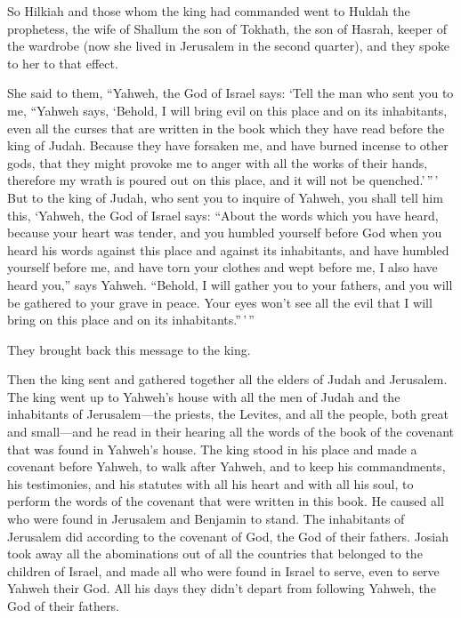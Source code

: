  So Hilkiah and those whom the king had commanded went to
Huldah the prophetess, the wife of Shallum the son of Tokhath, the son
of Hasrah, keeper of the wardrobe (now she lived in Jerusalem in the
second quarter), and they spoke to her to that effect.

 She said to them, ``Yahweh, the God of Israel says: `Tell
the man who sent you to me,  ``Yahweh says, `Behold, I will
bring evil on this place and on its inhabitants, even all the curses
that are written in the book which they have read before the king of
Judah.  Because they have forsaken me, and have burned
incense to other gods, that they might provoke me to anger with all the
works of their hands, therefore my wrath is poured out on this place,
and it will not be quenched.'\,''\,'  But to the king of
Judah, who sent you to inquire of Yahweh, you shall tell him this,
`Yahweh, the God of Israel says: ``About the words which you have heard,
 because your heart was tender, and you humbled yourself
before God when you heard his words against this place and against its
inhabitants, and have humbled yourself before me, and have torn your
clothes and wept before me, I also have heard you,'' says Yahweh.
 ``Behold, I will gather you to your fathers, and you will
be gathered to your grave in peace. Your eyes won't see all the evil
that I will bring on this place and on its inhabitants.''\,'\,''

They brought back this message to the king.

 Then the king sent and gathered together all the elders of
Judah and Jerusalem.  The king went up to Yahweh's house
with all the men of Judah and the inhabitants of Jerusalem---the
priests, the Levites, and all the people, both great and small---and he
read in their hearing all the words of the book of the covenant that was
found in Yahweh's house.  The king stood in his place and
made a covenant before Yahweh, to walk after Yahweh, and to keep his
commandments, his testimonies, and his statutes with all his heart and
with all his soul, to perform the words of the covenant that were
written in this book.  He caused all who were found in
Jerusalem and Benjamin to stand. The inhabitants of Jerusalem did
according to the covenant of God, the God of their fathers.
 Josiah took away all the abominations out of all the
countries that belonged to the children of Israel, and made all who were
found in Israel to serve, even to serve Yahweh their God. All his days
they didn't depart from following Yahweh, the God of their fathers.

